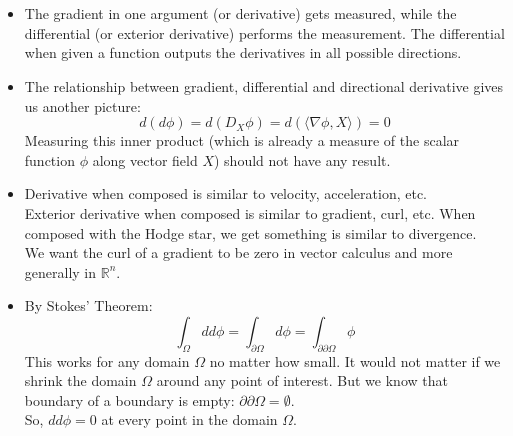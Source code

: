 \documentclass{article}
\begin{document}
\vspace{1.8cm}
\\\\

\begin{itemize}

    \item
    The gradient in one argument (or derivative) gets measured, while the differential (or exterior derivative) performs the
    measurement. The differential when given a function outputs the derivatives in all possible directions.

    \item
    The relationship between gradient, differential and directional derivative gives us another picture:
    $$
        d(d\phi) = d(D_X\phi) = d(\langle \nabla\phi, X \rangle) = 0
    $$
    Measuring this inner product (which is already a measure of the scalar function $\phi$ along vector field $X$)
    should not have any result.

    \item
    Derivative when composed is similar to velocity, acceleration, etc.\\
    Exterior derivative when composed is similar to gradient, curl, etc.
    When composed with the Hodge star, we get something is similar to divergence.\\
    We want the curl of a gradient to be zero in vector calculus and more generally in $\mathbb{R}^n$.

    \item
    By Stokes' Theorem:
    $$
        \int_\Omega dd\phi = \int_{\partial\Omega} d\phi = \int_{\partial\partial\Omega} \phi
    $$
    This works for any domain $\Omega$ no matter how small. It would not matter if we shrink the domain $\Omega$
    around any point of interest. But we know that boundary of a boundary is empty: $\partial\partial\Omega = \emptyset$.\\
    So, $dd\phi = 0$ at every point in the domain $\Omega$.

\end{itemize}


\pagebreak
{}\\\\
\end{document}
